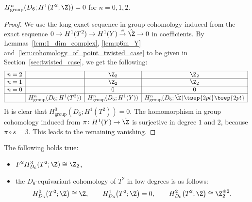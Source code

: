 \begin{lem}
$H^n_{\mathrm{group}}(D_6; H^1(T^2; \Z)) = 0$ for $n = 0, 1, 2$.
\end{lem}

\begin{proof}
We use the long exact sequence in group cohomology induced from the exact sequence $0 \to H^1(T^2) \to H^1(Y) \overset{\pi}{\to} \hat{\Z} \to 0$ in coef\/f\/icients. By Lemmas~\ref{lem:1_dim_complex}, \ref{lem:p6m_Y} and~\ref{lem:cohomology_of_point_twisted_case} to be given in Section~\ref{sec:twisted_case}, we get the following:
$$
\begin{array}{|c|c|c|c|}
\hline
n = 2 & & \Z_2 & \Z_2 \\
\hline
n = 1 & & \Z_2 & \Z_2 \\
\hline
n = 0 & & 0 & 0 \\
\hline
& H^n_{\mathrm{group}}(D_6; H^1(T^2)) & H^n_{\mathrm{group}}(D_6; H^1(Y)) &
H^n_{\mathrm{group}}(D_6; \hat{\Z})\tsep{2pt}\bsep{2pt}\\
\hline
\end{array}
$$
It is clear that $H^0_{\mathrm{group}}(D_6; H^1(T^2)) = 0$. The homomorphism in group cohomology induced from $\pi\colon H^1(Y) \to \hat{\Z}$ is surjective in degree $1$ and $2$, because $\pi \circ s = 3$. This leads to the remaining vanishing.
\end{proof}

\begin{thm}[\textsf{p6m}]
The following holds true:
\begin{itemize}\itemsep=0pt
\item[$(a)$] $F^2H^3_{D_6}(T^2; \Z) \cong \Z_2$,

\item[$(b)$] the $D_6$-equivariant cohomology of $T^2$ in low degrees is as follows:
\begin{gather*}
H^0_{D_6}\big(T^2; \Z\big) \cong \Z, \qquad H^1_{D_6}\big(T^2; \Z\big) = 0, \qquad H^2_{D_6}\big(T^2; \Z\big) \cong \Z_2^{\oplus 2}.
\end{gather*}
\end{itemize}
\end{thm}

